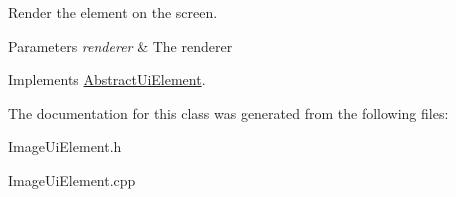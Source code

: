 Render the element on the screen. 


\begin{DoxyParams}{Parameters}
{\em renderer} & The renderer\\
\hline
\end{DoxyParams}


Implements \mbox{\hyperlink{class_abstract_ui_element_aea66ce333323cf2d5e12d4de9515de7b}{Abstract\+Ui\+Element}}.



The documentation for this class was generated from the following files\+:\begin{DoxyCompactItemize}
\item 
Image\+Ui\+Element.\+h\item 
Image\+Ui\+Element.\+cpp\end{DoxyCompactItemize}
